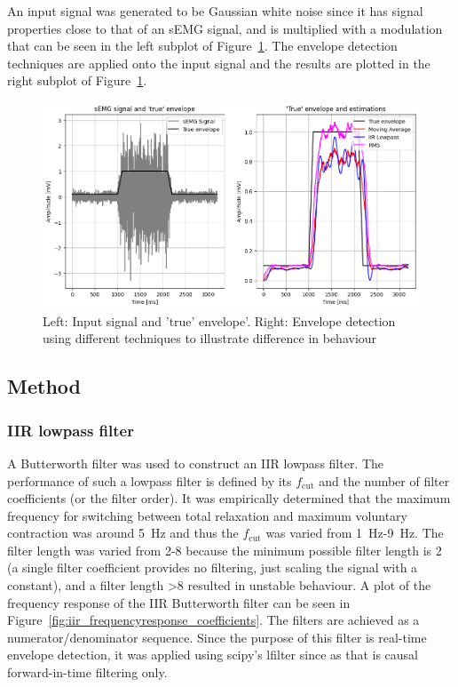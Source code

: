 An input signal was generated to be Gaussian white noise since it has signal properties close to that of an sEMG signal, and is multiplied with a modulation that can be seen in the left subplot of Figure~\ref{fig:envelope_detection}. The envelope detection techniques are applied onto the input signal and the results are plotted in the right subplot of Figure~\ref{fig:envelope_detection}.

\begin{figure}[h!t]
	\begin{center}
		\includegraphics[width=1.0\columnwidth]{images/envelope_detection.png}
	\end{center}
	\caption{Left: Input signal and 'true' envelope'. Right: Envelope detection using different techniques to illustrate difference in behaviour}
	\label{fig:envelope_detection}
\end{figure}

\subsection{Method}
\subsubsection{IIR lowpass filter}
A Butterworth filter was used to construct an IIR lowpass filter. The performance of such a lowpass filter is defined by its $f_\text{cut}$ and the number of filter coefficients (or the filter order). It was empirically determined that the maximum frequency for switching between total relaxation and maximum voluntary contraction was around \SI{5}{\hertz} and thus the $f_\text{cut}$ was varied from \SI{1}{\hertz}-\SI{9}{\hertz}. The filter length was varied from 2-8 because the minimum possible filter length is 2 (a single filter coefficient provides no filtering, just scaling the signal with a constant), and a filter length >8 resulted in unstable behaviour. A plot of the frequency response of the IIR Butterworth filter can be seen in Figure~\ref{fig:iir_frequencyresponse_coefficients}. The filters are achieved as a numerator/denominator sequence. Since the purpose of this filter is real-time envelope detection, it was applied using scipy's lfilter since as that is causal forward-in-time filtering only.


